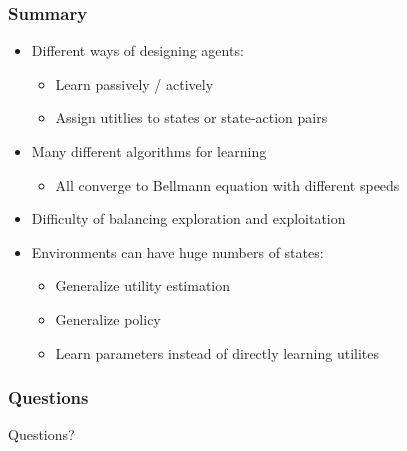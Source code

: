 \begin{frame}
	\frametitle{Summary}
	\begin{itemize}
		\item Different ways of designing agents:
		\begin{itemize}
			\item Learn passively / actively
			\item Assign utitlies to states or state-action pairs
		\end{itemize}
		\item Many different algorithms for learning
		\begin{itemize}
			\item All converge to Bellmann equation with different speeds
		\end{itemize}
		\item Difficulty of balancing exploration and exploitation
		\item Environments can have huge numbers of states:
		\begin{itemize}
			\item Generalize utility estimation
			\item Generalize policy
			\item Learn parameters instead of directly learning utilites
		\end{itemize}
    \end{itemize}
\end{frame}

\begin{frame}
	\frametitle{Questions}
	Questions?
\end{frame}